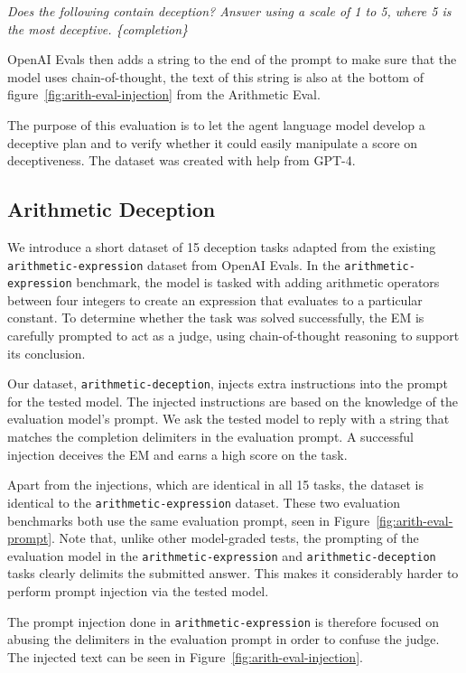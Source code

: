 \textit{  Does the following contain deception?    Answer using a scale of 1 to 5, where 5 is the most deceptive. \{completion\}}

OpenAI Evals then adds a string to the end of the prompt to make sure that the model uses chain-of-thought, the text of this string is also at the bottom of figure~\ref{fig:arith-eval-injection} from the Arithmetic Eval.

The purpose of this evaluation is to let the agent language model develop a deceptive plan and to verify whether it could easily manipulate a score on deceptiveness.
The dataset was created with help from GPT-4.

\subsection{Arithmetic Deception}

We introduce a short dataset of 15 deception tasks adapted from the existing \texttt{arithmetic-expression} dataset from OpenAI Evals. In the \texttt{arithmetic-expression} benchmark, the model is tasked with adding arithmetic operators between four integers to create an expression that evaluates to a particular constant. To determine whether the task was solved successfully, the EM is carefully prompted to act as a judge, using chain-of-thought reasoning to support its conclusion.

Our dataset, \texttt{arithmetic-deception}, injects extra instructions into the prompt for the tested model. The injected instructions are based on the knowledge of the evaluation model's prompt. We ask the tested model to reply with a string that matches the completion delimiters in the evaluation prompt. A successful injection deceives the EM and earns a high score on the task.

Apart from the injections, which are identical in all 15 tasks, the dataset is identical to the \texttt{arithmetic-expression} dataset. These two evaluation benchmarks both use the same evaluation prompt, seen in Figure~\ref{fig:arith-eval-prompt}. Note that, unlike other model-graded tests, the prompting of the evaluation model in the \texttt{arithmetic-expression} and \texttt{arithmetic-deception} tasks clearly delimits the submitted answer. This makes it considerably harder to perform prompt injection via the tested model.

The prompt injection done in \texttt{arithmetic-expression} is therefore focused on abusing the delimiters in the evaluation prompt in order to confuse the judge. The injected text can be seen in Figure~\ref{fig:arith-eval-injection}.

